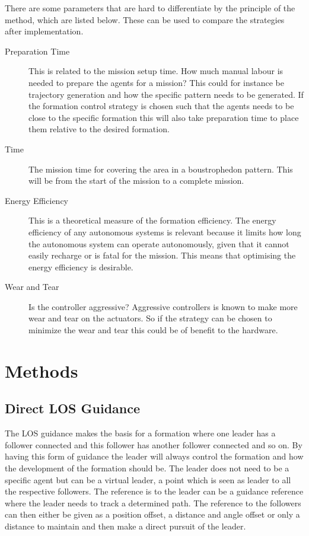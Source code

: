 There are some parameters that are hard to differentiate by the principle
of the method, which are listed below. These can be used to compare the
strategies after implementation.
\begin{description}
\item[Preparation Time] This is related to the mission setup time. How
	much manual labour is needed to prepare the agents for a mission?
	This could for instance be trajectory generation and how the
	specific pattern needs to be generated. If the formation control strategy is chosen such that the agents needs to be close to the specific formation this will also take preparation time to place them relative to the desired formation.
\item[Time] The mission time for covering the area in a boustrophedon
	pattern. This will be from the start of the mission to a complete mission.
\item[Energy Efficiency] This is a theoretical measure of the
	formation efficiency. The energy efficiency of any autonomous systems is relevant because it limits how long the autonomous system can operate autonomously, given that it cannot easily recharge or is fatal for the mission. This means that optimising the energy efficiency is desirable.
\item[Wear and Tear] Is the controller aggressive? Aggressive
	controllers is known to make more wear and tear on the actuators. So
	if the strategy can be chosen to minimize the wear and tear this
	could be of benefit to the hardware.
\end{description}


\section{Methods}

\subsection{Direct LOS Guidance}
The \ac{LOS} guidance makes the basis for a formation where one leader has a follower connected and this follower has another follower connected and so on. By having this form of guidance the leader will always control the formation and how the development of the formation should be. The leader does not need to be a specific agent but can be a virtual leader, a point which is seen as leader to all the respective followers. The reference is to the leader can be a guidance reference where the leader needs to track a determined path. The reference to the followers can then either be given as a position offset, a distance and angle offset or only a distance to maintain and then make a direct pursuit of the leader.
